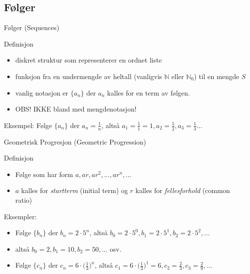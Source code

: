 \subsection*{Følger}

\begin{frame}{Følger (Sequences)}
    \pause
    \begin{block}{Definisjon}
        \begin{itemize}
            \item diskret struktur som representerer en ordnet liste\\
            \item funksjon fra en undermengde av heltall (vanligvis $\mathbb{N}$ eller $\mathbb{N}_0$) til en mengde $S$\\
            \item vanlig notasjon er $\{a_n\}$ der $a_n$ kalles for en term av følgen.
            \item OBS! IKKE bland med mengdenotasjon!
        \end{itemize}
    \end{block}
    \pause
    Eksempel: Følge $\{a_n\}$ der $a_n = \frac{1}{n}$, altså $a_1 = \frac{1}{1} = 1, a_2 = \frac{1}{2}, a_3 = \frac{1}{3}...$\\
\end{frame}

\begin{frame}{Geometrisk Progresjon (Geometric Progression)}
    \pause
    \begin{block}{Definisjon}
        \begin{itemize}
            \item Følge som har form $a, ar, ar^2, ..., ar^n, ...$
            \item $a$ kalles for \textit{startterm} (initial term) og $r$ kalles for \textit{fellesforhold} (common ratio)
        \end{itemize}
    \end{block}
    \pause
    Eksempler:\\
    \begin{itemize}
        \item Følge $\{b_n\}$ der $b_n = 2 \cdot 5^n$, altså $b_0 = 2 \cdot 5^0, b_1 = 2 \cdot 5^1, b_2 = 2 \cdot 5^2, ...$
        \pause
        \item altså $b_0 = 2, b_1 = 10, b_2 = 50, ...$ osv.
        \pause
        \item Følge $\{c_n\}$ der $c_n = 6 \cdot \big( \frac{1}{3} \big)^n$, altså $c_1 = 6 \cdot \big( \frac{1}{3} \big)^1 = 6, c_2 = \frac{2}{3}, c_3 = \frac{2}{9}, ...$
    \end{itemize}
\end{frame}

